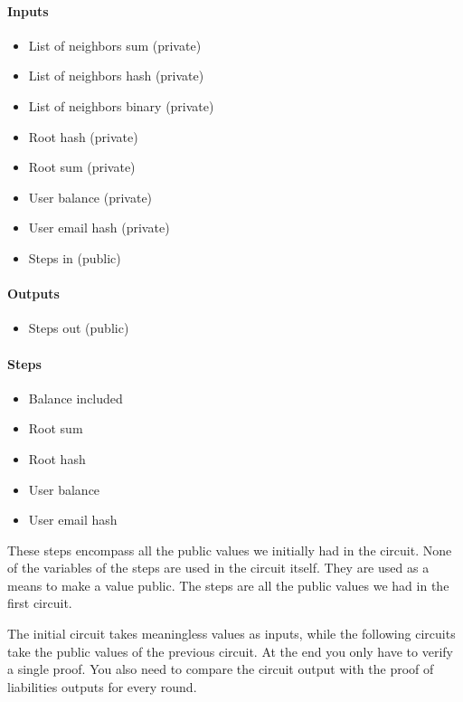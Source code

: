 \paragraph{Inputs}
\begin{itemize}


   \item List of neighbors sum (private)
  
   \item List of neighbors hash (private)


   \item List of neighbors binary (private)


   \item Root hash (private)


   \item Root sum (private)


   \item User balance (private)


   \item User email hash (private)


   \item Steps in (public)
  
   \end{itemize}


\paragraph{Outputs}
\begin{itemize}
   \item Steps out (public)
   \end{itemize}


\paragraph{Steps}
\begin{itemize}
   \item Balance included
   \item Root sum
   \item Root hash
   \item User balance
   \item User email hash
   \end{itemize}
These steps encompass all the public values we initially had in the circuit.
None of the variables of the steps are used in the circuit itself. They are used as a means to make a value public.
The steps are all the public values we had in the first circuit.


The initial circuit takes meaningless values as inputs, while the following circuits take the public values of the previous circuit.
At the end you only have to verify a single proof. You also need to compare the circuit output with the proof of liabilities outputs for every round.


